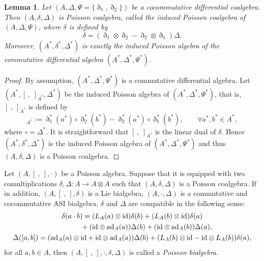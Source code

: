 \documentclass[10pt,a4paper]{amsart}
\numberwithin{equation}{section}
\newtheorem{Lemma}[Theorem]{Lemma}
\newcommand{\ad}{\mathrm{ad}}
\newcommand{\id}{\mathrm{id}}
\begin{document}
\begin{Lemma} Let $(A, \Delta, \Psi \!=\! \{\eth_1, \eth_2\})$ be a cocommutative differential coalgebra.
 Then $(A, \delta, \Delta)$ is Poisson coalgebra, called the \textit{induced Poisson coalgebra} of $(A, \Delta, \Psi)$, where $\delta$ is defined by
 \begin{equation}
 \delta = (\eth_1 \otimes \eth_2 - \eth_2 \otimes \eth_1)
 \Delta. \label{eq:coP}
 \end{equation}
 Moreover, $(A^*, \delta^*, \Delta^*)$ is exactly the induced Poisson algebra of the commutative differential algebra $(A^*, \Delta^*, \Psi^*)$.
\end{Lemma}
\begin{proof}
 By assumption, $(A^*, \Delta^*, \Psi^*)$ is a commutative differential algebra.
 Let $(A^*, [\ ,\ ]_{A^*}, \Delta^*)$ be the induced Poisson algebra of $(A^*, \Delta^*, \Psi^*)$, that is, $[\ ,\ ]_{A^*}$ is defined by
 \begin{equation*}
 [a^*, b^*]_{A^*} := \eth_1^*(a^*) \circ \eth_2^*(b^*) - \eth_2^*(a^*) \circ \eth_1^*(b^*), \qquad \forall a^*, b^*\in A^*,
 \end{equation*}
 where $\circ = \Delta^*$.
 It is straightforward that $[\ ,\ ]_{A^*}$ is the linear dual of $\delta$.
 Hence $(A^*, \delta^*, \Delta^*)$ is the induced Poisson algebra of $(A^*, \Delta^*, \Psi^*)$ and thus $(A, \delta, \Delta)$ is a Poisson coalgebra.
\end{proof}

\begin{Definition}
 Let $(A, [\ ,\ ], \cdot)$ be a Poisson algebra.
 Suppose that it is equipped with two comultiplications $\delta, \Delta\colon A \to A \otimes A$ such that $(A, \delta, \Delta)$ is a Poisson coalgebra.
 If in addition, $(A, [\ ,\ ], \delta)$ is a Lie bialgebra,
 $(A, \cdot, \Delta)$ is a commutative and cocommutative ASI bialgebra,
 $\delta$ and $\Delta$ are compatible in the following sense:
 \begin{gather}
 	\delta(a \cdot b) = (L_A(a) \otimes \id)\delta(b) + (L_A(b) \otimes \id)\delta(a) \nonumber\\
 \hphantom{\delta(a \cdot b) =}{} + (\id \otimes \ad_A(a))\Delta(b) + (\id \otimes \ad_A(b))\Delta(a), \label{eq:poibi1} \\
 \Delta([a, b]) = (\ad_A(a) \otimes \id + \id \otimes \ad_A(a))\Delta(b) + (L_A(b) \otimes \id - \id \otimes L_A(b))\delta(a), \label{eq:poibi2}
 \end{gather}
 for all $a, b \in A$, then $(A, [\ ,\ ], \cdot, \delta, \Delta)$ is called a \textit{Poisson bialgebra}.
\end{Definition}
\end{document}

